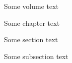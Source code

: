 \newpage
{}
%
Some volume text

%
Some chapter text

%
Some section text

%
Some subsection text

\Rmajortoc


